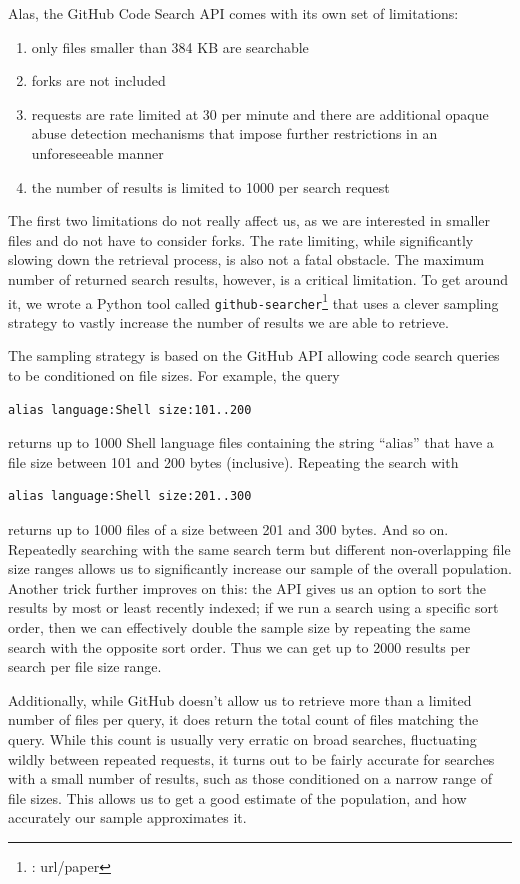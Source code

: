 Alas, the GitHub Code Search API comes with its own set of limitations:
\begin{enumerate}
    \item only files smaller than 384 KB are searchable
    \item forks are not included
    \item requests are rate limited at 30 per minute and there are additional opaque abuse detection mechanisms that impose further restrictions in an unforeseeable manner
    \item the number of results is limited to 1000 per search request
\end{enumerate}
The first two limitations do not really affect us, as we are interested in smaller files and do not have to consider forks.
The rate limiting, while significantly slowing down the retrieval process, is also not a fatal obstacle.
The maximum number of returned search results, however, is a critical limitation.
To get around it, we wrote a Python tool called \verb|github-searcher|\footnote{\TODO: url/paper} that uses a clever sampling strategy to vastly increase the number of results we are able to retrieve.

The sampling strategy is based on the GitHub API allowing code search queries to be conditioned on file sizes. 
For example, the query 
\begin{verbatim}
alias language:Shell size:101..200
\end{verbatim}
returns up to 1000 Shell language files containing the string ``alias'' that have a file size between 101 and 200 bytes (inclusive).
Repeating the search with 
\begin{verbatim}
alias language:Shell size:201..300
\end{verbatim}
returns up to 1000 files of a size between 201 and 300 bytes.
And so on.
Repeatedly searching with the same search term but different non-overlapping file size ranges allows us to significantly increase our sample of the overall population.
Another trick further improves on this: 
the API gives us an option to sort the results by most or least recently indexed;
if we run a search using a specific sort order, then we can effectively double the sample size by repeating the same search with the opposite sort order.
Thus we can get up to 2000 results per search per file size range.

Additionally, while GitHub doesn't allow us to retrieve more than a limited number of files per query, it does return the total count of files matching the query.
While this count is usually very erratic on broad searches, fluctuating wildly between repeated requests, it turns out to be fairly accurate for searches with a small number of results, such as those conditioned on a narrow range of file sizes.
This allows us to get a good estimate of the population, and how accurately our sample approximates it.

